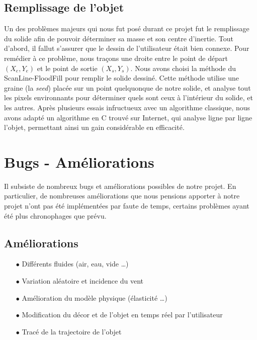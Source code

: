 \subsection{Remplissage de l'objet}
Un des problèmes majeurs qui nous fut posé durant ce projet fut le remplissage
du solide afin de pouvoir déterminer sa masse et son centre d'inertie.
Tout d'abord, il fallut s'assurer que le dessin de l'utilisateur était bien connexe.
Pour remédier à ce problème, nous traçons une droite entre le point de départ
$(X_e,Y_e)$ et le point de sortie $(X_s,Y_s)$.
Nous avons choisi la méthode du ScanLine-FloodFill pour remplir le solide dessiné.
Cette méthode utilise une graine (la \emph{seed}) placée sur un point quelquonque
de notre solide, et analyse tout les pixels environnants pour déterminer
quels sont ceux à l'intérieur du solide, et les autres.
Après plusieurs essais infructueux avec un algorithme classique, nous avons
adapté un algorithme en C trouvé sur Internet, qui analyse ligne par ligne l'objet,
permettant ainsi un gain considérable en efficacité. 
%

\newpage

\section{Bugs - Améliorations}
Il subsiste de nombreux bugs et améliorations possibles de notre projet.
En particulier, de nombreuses améliorations que nous pensions apporter
à notre projet n'ont pas été implémentées par faute de temps, certains 
problèmes ayant été plus chronophages que prévu.
\subsection{Améliorations}
\begin{itemize}
\item[$\bullet$] Différents fluides (air, eau, vide \dots)
\item[$\bullet$] Variation aléatoire et incidence du vent 
\item[$\bullet$] Amélioration du modèle physique (élasticité \dots )
\item[$\bullet$] Modification du décor et de l'objet en temps réel par l'utilisateur
\item[$\bullet$] Tracé de la trajectoire de l'objet
\end{itemize}

